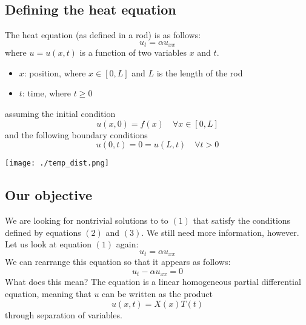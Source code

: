 \documentclass[a4paper]{article}
\begin{document}
        \subsection{Defining the heat equation}
            The heat equation (as defined in a rod) is as follows:
            \begin{equation}
                u_{t} = \alpha u_{xx}
            \end{equation}
            where $u = u\left(x,t\right)$ is a function of two variables $x$ and $t$.
            \begin{itemize}
                \item $x$: position, where $x \in [0,L]$ and $L$ is the length of the rod
                \item $t$: time, where $t\geq0$
            \end{itemize}
            assuming the initial condition
            \begin{equation}
                u\left(x,0\right) = f\left(x\right) \quad \forall x \in [0,L]
            \end{equation}
            and the following boundary conditions
            \begin{equation}
                u\left(0,t\right) = 0 = u\left(L,t\right) \quad \forall t > 0
            \end{equation}

            \begin{center}
                \texttt{[image: ./temp\_dist.png]}
            \end{center}

        \subsection{Our objective}
            We are looking for nontrivial solutions to to $\left(1\right)$ that satisfy the conditions defined by
            equations $\left(2\right)$ and $\left(3\right)$. We still need more information, however. Let us look at equation
            $\left(1\right)$ again:
            \[
                u_{t} = \alpha u_{xx}
            \]
            We can rearrange this equation so that it appears as follows:
            \[
                u_{t} - \alpha u_{xx} = 0
            \]
            What does this mean? The equation is a linear homogeneous partial differential equation,
            meaning that $u$ can be written as the product
            \begin{equation}
                u\left(x,t\right)=X\left(x\right)T\left(t\right)
            \end{equation}
            through separation of variables.
\end{document}

